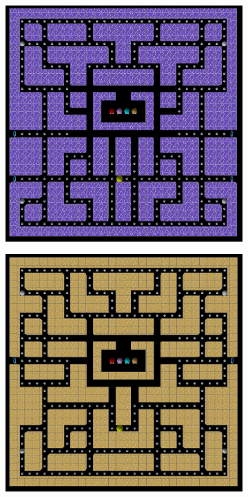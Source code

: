 \begin{figure}[H]
\begin{subfigure}[b]{0.48\textwidth}
        \end{subfigure}
        \vspace{0.2cm}
        \\
        \begin{subfigure}[b]{0.48\textwidth}
            \includegraphics[scale=0.18]{img/laberinto3.png}
        \end{subfigure}
        \hfill
        \begin{subfigure}[b]{0.48\textwidth}
            \includegraphics[scale=0.18]{img/laberinto4.png}

\end{subfigure}
\end{figure}
